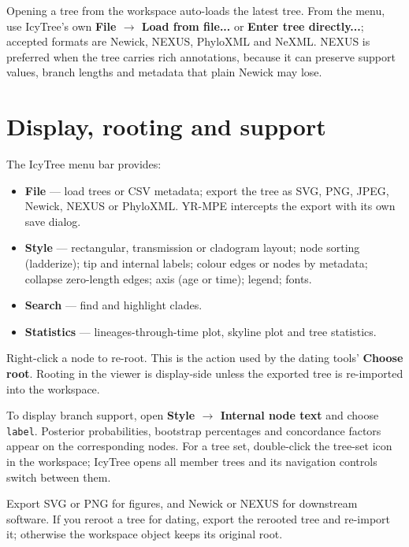\documentclass[10pt]{report}
\begin{document}
Opening a tree from the workspace auto-loads the latest tree. From the menu,
use IcyTree's own \textbf{File $\rightarrow$ Load from file...} or
\textbf{Enter tree directly...}; accepted formats are Newick, NEXUS, PhyloXML
and NeXML. NEXUS is preferred when the tree carries rich annotations, because
it can preserve support values, branch lengths and metadata that plain Newick
may lose.

\section{Display, rooting and support}

The IcyTree menu bar provides:

\begin{itemize}
  \item \textbf{File} --- load trees or CSV metadata; export the tree as SVG,
        PNG, JPEG, Newick, NEXUS or PhyloXML. YR-MPE intercepts the export
        with its own save dialog.
  \item \textbf{Style} --- rectangular, transmission or cladogram layout;
        node sorting (ladderize); tip and internal labels; colour edges or
        nodes by metadata; collapse zero-length edges; axis (age or time);
        legend; fonts.
  \item \textbf{Search} --- find and highlight clades.
  \item \textbf{Statistics} --- lineages-through-time plot, skyline plot and
        tree statistics.
\end{itemize}

Right-click a node to re-root. This is the action used by the dating tools'
\textbf{Choose root}. Rooting in the viewer is display-side unless the exported
tree is re-imported into the workspace.

To display branch support, open \textbf{Style $\rightarrow$ Internal node text}
and choose \texttt{label}. Posterior probabilities, bootstrap percentages and
concordance factors appear on the corresponding nodes. For a tree set,
double-click the tree-set icon in the workspace; IcyTree opens all member trees
and its navigation controls switch between them.

\begin{tip}
Export SVG or PNG for figures, and Newick or NEXUS for downstream software.
If you reroot a tree for dating, export the rerooted tree and re-import it;
otherwise the workspace object keeps its original root.
\end{tip}
\end{document}
